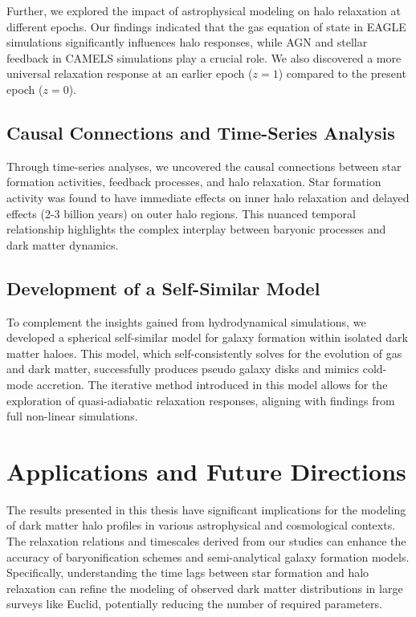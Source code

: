 Further, we explored the impact of astrophysical modeling on halo relaxation at different epochs. Our findings indicated that the gas equation of state in EAGLE simulations significantly influences halo responses, while AGN and stellar feedback in CAMELS simulations play a crucial role. We also discovered a more universal relaxation response at an earlier epoch ($z=1$) compared to the present epoch ($z=0$).

\subsection*{Causal Connections and Time-Series Analysis}
Through time-series analyses, we uncovered the causal connections between star formation activities, feedback processes, and halo relaxation. Star formation activity was found to have immediate effects on inner halo relaxation and delayed effects (2-3 billion years) on outer halo regions. This nuanced temporal relationship highlights the complex interplay between baryonic processes and dark matter dynamics.

\subsection*{Development of a Self-Similar Model}
To complement the insights gained from hydrodynamical simulations, we developed a spherical self-similar model for galaxy formation within isolated dark matter haloes. This model, which self-consistently solves for the evolution of gas and dark matter, successfully produces pseudo galaxy disks and mimics cold-mode accretion. The iterative method introduced in this model allows for the exploration of quasi-adiabatic relaxation responses, aligning with findings from full non-linear simulations.

\section*{Applications and Future Directions}
The results presented in this thesis have significant implications for the modeling of dark matter halo profiles in various astrophysical and cosmological contexts. The relaxation relations and timescales derived from our studies can enhance the accuracy of baryonification schemes and semi-analytical galaxy formation models. Specifically, understanding the time lags between star formation and halo relaxation can refine the modeling of observed dark matter distributions in large surveys like Euclid, potentially reducing the number of required parameters.

